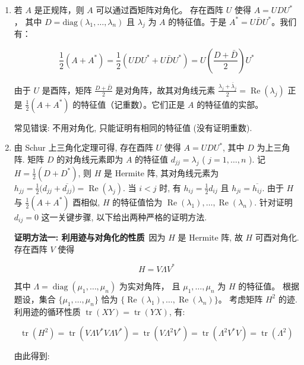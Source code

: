 \begin{enumerate}
\item
  若 \(A\) 是正规阵，则 \(A\) 可以通过酉矩阵对角化。
  存在酉阵 \(U\) 使得 \(A = UDU^{*}\)，
  其中 \(D = \mathrm{diag}(\lambda_1, \ldots, \lambda_n)\) 
  且 \(\lambda_j\) 为 \(A\) 的特征值。于是 \(A^{*} = U\bar{D}U^{*}\)。我们有：

\[\frac {1}{2} (A + A ^ {*}) = \frac {1}{2} (U D U ^ {*} + U \bar {D} U ^ {*}) 
= U \left(\frac {D + \bar {D}}{2}\right) U ^ {*}\]

由于 $U$ 是酉阵，矩阵 \(\frac{D+\bar{D}}{2}\) 是对角阵，故其对角线元素
\(\frac{\lambda_{j}+\bar{\lambda}_{j}}{2} = \operatorname{Re}(\lambda_{j})\)
正是 \(\frac{1}{2}(A+A^{*})\) 的特征值（记重数）。它们正是 $A$ 的特征值的实部。

常见错误: 不用对角化, 只能证明有相同的特征值 (没有证明重数).

\item
  由 Schur 上三角化定理可得, 存在酉阵 \(U\) 使得 \(A = UDU^{*}\), 
  其中 \(D\) 为上三角阵. 矩阵 \(D\) 的对角线元素即为 \(A\) 的特征值
  \(d_{jj} = \lambda_{j}\) ( \(j = 1, \ldots, n\) ). 
  记 \(H = \frac{1}{2}(D + D^{*})\), 则 \(H\) 是 Hermite 阵, 其对角线元素为
  \(h_{jj} = \frac{1}{2}\big(d_{jj} + \overline{d_{jj}}\big) = \operatorname{Re}(\lambda_{j})\).
 当 \(i < j\) 时, 有 \(h_{ij} = \frac{1}{2} d_{ij}\) 且
  \(h_{ji} = \overline{h_{ij}}\). 由于 \(H\) 与
  \(\frac{1}{2}(A + A^{*})\) 酉相似, \(H\) 的特征值恰为
  \(\operatorname{Re}(\lambda_1), \ldots, \operatorname{Re}(\lambda_n)\).
 针对证明 \(d_{ij} = 0\) 这一关键步骤, 以下给出两种严格的证明方法.

\textbf{证明方法一: 利用迹与对角化的性质}\ 
因为 \(H\) 是 Hermite 阵, 故 \(H\) 可酉对角化. 存在酉阵 \(V\) 使得

\[H = V \Lambda V^{*}\]

其中 \(\Lambda = \operatorname{diag}(\mu_1, \ldots, \mu_n)\) 为实对角阵，
且 \(\mu_1, \ldots, \mu_n\) 为 \(H\) 的特征值。
根据题设，集合 \(\{\mu_1, \ldots, \mu_n\}\) 恰为
\(\{\operatorname{Re}(\lambda_1), \ldots, \operatorname{Re}(\lambda_n)\}\)。
考虑矩阵 \(H^{2}\) 的迹. 利用迹的循环性质 
\(\operatorname{tr}(XY)=\operatorname{tr}(YX)\), 有:

\[\operatorname{tr} \left(H^{2}\right) 
= \operatorname{tr} \left(V \Lambda V^{*} V \Lambda V^{*}\right) 
= \operatorname{tr} \left(V \Lambda^{2} V^{*}\right) 
= \operatorname{tr} \left(\Lambda^{2} V^{*} V\right) 
= \operatorname{tr} \left(\Lambda^{2}\right)\]

由此得到:


\end{enumerate}
